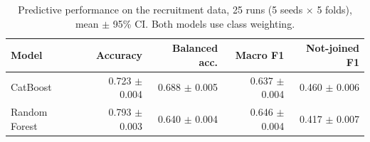 \begin{table}[t]
\centering
\caption{Predictive performance on the recruitment data, 25 runs (5 seeds $\times$ 5 folds), mean $\pm$ 95\% CI. Both models use class weighting.}
\label{tab:cv}
\small
\setlength{\tabcolsep}{4pt}
\begin{tabular}{lrrrr}
\toprule
Model & Accuracy & Balanced acc. & Macro F1 & Not-joined F1 \\
\midrule
CatBoost & 0.723 $\pm$ 0.004 & 0.688 $\pm$ 0.005 & 0.637 $\pm$ 0.004 & 0.460 $\pm$ 0.006 \\
Random Forest & 0.793 $\pm$ 0.003 & 0.640 $\pm$ 0.004 & 0.646 $\pm$ 0.004 & 0.417 $\pm$ 0.007 \\
\bottomrule
\end{tabular}
\end{table}
